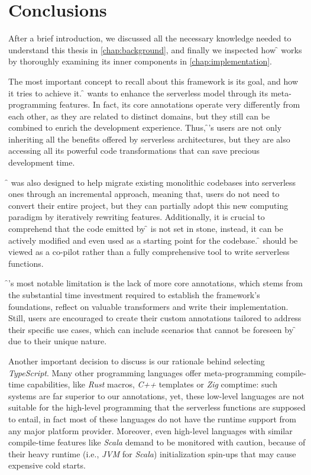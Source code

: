 \chapter{Conclusions}
\label{chap:conclusion}

After a brief introduction, we discussed all the necessary knowledge needed
to understand this thesis in \cref{chap:background}, and finally we inspected
how \f{} works by thoroughly examining its inner components in \cref{chap:implementation}.

The most important concept to recall about this framework is its goal,
and how it tries to achieve it.
\f{} wants to enhance the serverless model through its meta-programming
features. In fact, its core annotations operate very differently from each other,
as they are related to distinct domains, but they still can be combined
to enrich the development experience.
Thus, \f{}'s users are not only inheriting all the
benefits offered by serverless architectures,
but they are also accessing all its powerful code
transformations that can save precious development time.

\f{} was also designed to help migrate existing
monolithic codebases into serverless ones through an incremental approach,
meaning that, users do not need to convert their entire project, but they
can partially adopt this new computing paradigm by iteratively rewriting features.
Additionally, it is crucial to comprehend that the code
emitted by \f{} is not set in stone, instead, it can be actively modified
and even used as a starting point for the codebase.
\f{} should be viewed as a co-pilot rather than a fully comprehensive tool to write serverless functions.

\f{}'s most notable limitation is the lack of more core annotations,
which stems from the substantial time investment required
to establish the framework's foundations, reflect on valuable transformers and write their implementation.
Still, users are encouraged to create their custom annotations
tailored to address their specific use cases, which can include scenarios
that cannot be foreseen by \f{} due to their unique nature.

Another important decision to discuss is our rationale behind selecting \textit{TypeScript}.
Many other programming languages offer meta-programming compile-time capabilities,
like \textit{Rust} macros, \textit{C++} templates or \textit{Zig} comptime:
such systems are far superior to our annotations, yet,
these low-level languages are not suitable for the high-level programming
that the serverless functions are supposed to entail, in fact most of these languages
do not have the runtime support from any major platform provider.
Moreover, even high-level languages with similar compile-time features like \textit{Scala}
demand to be monitored with caution, because of their heavy
runtime (i.e., \textit{JVM} for \textit{Scala}) initialization spin-ups
that may cause expensive cold starts.

